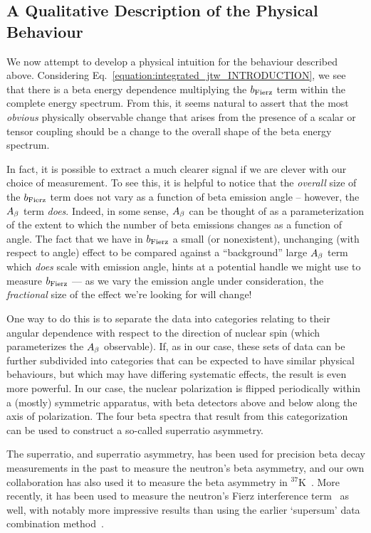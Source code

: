 \subsection{A Qualitative Description of the Physical Behaviour}
\label{signature_chapter}
We now attempt to develop a physical intuition for the behaviour described above.  Considering Eq.~\ref{equation:integrated_jtw_INTRODUCTION}, we see that there is a beta energy dependence multiplying the $b_{\mathrm{Fierz}}$ term within the complete energy spectrum.  From this, it seems natural to assert that the most \emph{obvious} physically observable change that arises from the presence of a scalar or tensor coupling should be a change to the overall shape of the beta energy spectrum.  

In fact, it is possible to extract a much clearer signal if we are clever with our choice of measurement.  To see this, it is helpful to notice that the \emph{overall} size of the $b_{\mathrm{Fierz}}$ term does not vary as a function of beta emission angle -- however, the $A_{\beta}$ term \emph{does}.  Indeed, in some sense, $A_{\beta}$ can be thought of as a parameterization of the extent to which the number of beta emissions changes as a function of angle.  The fact that we have in $b_{\mathrm{Fierz}}$ a small (or nonexistent), unchanging (with respect to angle) effect to be compared against a ``background'' large $A_{\beta}$ term which \emph{does} scale with emission angle, hints at a potential handle we might use to measure $b_{\mathrm{Fierz}}$ --- as we vary the emission angle under consideration, the \emph{fractional} size of the effect we're looking for will change!

One way to do this is to separate the data into categories relating to their angular dependence with respect to the direction of nuclear spin (which parameterizes the $A_{\beta}$ observable).  If, as in our case, these sets of data can be further subdivided into categories that can be expected to have similar physical behaviours, but which may have differing systematic effects, the result is even more powerful.  In our case, the nuclear polarization is flipped periodically within a (mostly) symmetric apparatus, with beta detectors above and below along the axis of polarization.  The four beta spectra that result from this categorization can be used to construct a so-called superratio asymmetry.   

The superratio, and superratio asymmetry, has been used for precision beta decay measurements in the past to measure the neutron's beta asymmetry\cite{UCNA_first_superratio}, and our own collaboration has also used it to measure the beta asymmetry in $^{37}$K~\cite{ben_Abeta}.  More recently, it has been used to measure the neutron's Fierz interference term~\cite{UCNAfierz2020}\cite{Saul2020} as well, with notably more impressive results than using the earlier `supersum' data combination method~\cite{UCNA_first_Fierz}.  

